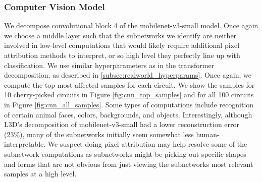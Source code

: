\documentclass{article}
\theoremstyle{plain}
\theoremstyle{definition}
\theoremstyle{remark}
\begin{document}
\subsubsection{Computer Vision Model}
We decompose convolutional block 4 of the mobilenet-v3-small model.  Once again we choose a middle layer such that the subnetworks we identify are neither involved in low-level computations that would likely require additional pixel attribution methods to interpret, or so high level they perfectly line up with classification. We use similar hyperparameters as in the transformer decomposition, as described in \ref{subsec:realworld_hyperparams}. Once again, we compute the top most affected samples for each circuit. We show the samples for 10 cherry-picked circuits in Figure \ref{fig:cnn_top_samples} and for all 100 circuits in Figure \ref{fig:cnn_all_samples}.  Some types of computations include recognition of certain animal faces, colors, backgrounds, and objects. Interestingly, although L3D's decomposition of  mobilenet-v3-small had a lower reconstruction error (23\%), many of the subnetworks initially seem somewhat less human-interpretable. We suspect doing pixel attribution may help resolve some of the subnetwork computations as subnetworks might be picking out specific shapes and forms that are not obvious from just viewing the subnetworks most relevant samples at a high level. 
\end{document}
